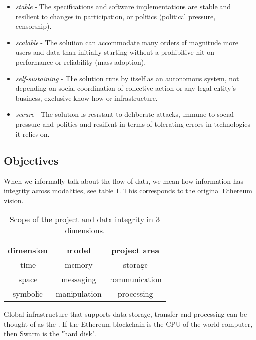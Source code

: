 \begin{itemize}
\item \emph{stable} - The specifications and software implementations are stable and resilient to changes in participation, or politics (political pressure, censorship).
\item \emph{scalable} - The solution can accommodate many orders of magnitude more users and data than initially starting without a prohibitive hit on performance or reliability (mass adoption).
\item \emph{self-sustaining} - The solution runs by itself as an autonomous system, not depending on social coordination of collective action or any legal entity's business, exclusive know-how or infrastructure.   
\item \emph{secure} - The solution is resistant to deliberate attacks, immune to  social pressure  and politics and resilient in terms of tolerating errors in technologies it relies on. 
\end{itemize}





\subsection{Objectives \statusyellow}\label{sec:objectives}


When we informally talk about the flow of data, we mean how information has  integrity across modalities, see table \ref{tab:scope}. This corresponds to the original Ethereum vision.

\begin{table}[htb]
\centering
\begin{tabular}{c|c|c}
dimension & model & project area\\\hline
%
time & memory & storage \\
space & messaging & communication \\
symbolic & manipulation & processing \\
\end{tabular}
\caption{Scope of the project and data integrity in 3 dimensions.}
\label{tab:scope}
\end{table}

Global infrastructure that supports data storage, transfer and processing 
can be thought of as the . If the Ethereum blockchain is the CPU of the world computer, then Swarm is the "hard disk".

